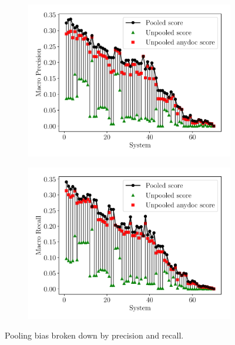 \begin{figure}[!t]
  \centering
  \begin{subfigure}{0.8\columnwidth}
      \includegraphics[width=\textwidth]{figures/pooling_bias/pooling_bias_p}
  \end{subfigure}

  \begin{subfigure}{0.8\columnwidth}
      \includegraphics[width=\textwidth]{figures/pooling_bias/pooling_bias_r}
  \end{subfigure}
  \caption[Pooling bias for precision and recall in TAC-KBP 2015]{\label{fig:pooling-bias-p-r} Pooling bias broken down by precision and recall.}
\end{figure}

